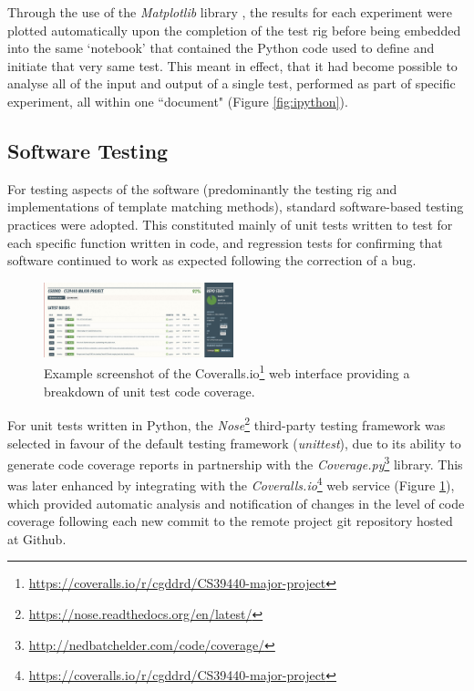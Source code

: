 Through the use of the \textit{Matplotlib} library \cite{matplotlib}, the results for each experiment were plotted automatically upon the completion of the test rig before being embedded into the same `notebook' that contained the Python code used to define and initiate that very same test. This meant in effect, that it had become possible to analyse all of the input and output of a single test, performed as part of specific experiment, all within one ``document" (Figure \ref{fig:ipython}).

\subsection{Software Testing}

For testing aspects of the software (predominantly the testing rig and implementations of template matching methods), standard software-based testing practices were adopted. This constituted mainly of unit tests written to test for each specific function written in code, and regression tests for confirming that software continued to work as expected following the correction of a bug.

\begin{figure}
\vspace{-20pt}
  \begin{center}
    \includegraphics[width=0.49\textwidth]{images/coveralls.png}
  \end{center}
  \vspace{-10pt}
  \caption{Example screenshot of the Coveralls.io\footnote{\url{https://coveralls.io/r/cgddrd/CS39440-major-project}} web interface providing a breakdown of unit test code coverage.}
     \label{fig:coveralls}
  \vspace{-10pt}
\end{figure}

For unit tests written in Python, the \textit{Nose}\footnote{\url{https://nose.readthedocs.org/en/latest/}} third-party testing framework was selected in favour of the default testing framework (\textit{unittest}), due to its ability to generate code coverage reports in partnership with the \textit{Coverage.py}\footnote{\url{http://nedbatchelder.com/code/coverage/}} library. This was later enhanced by integrating with the \textit{Coveralls.io}\footnote{\url{https://coveralls.io/r/cgddrd/CS39440-major-project}} web service (Figure \ref{fig:coveralls}), which provided automatic analysis and notification of changes in the level of code coverage following each new commit to the remote project git repository hosted at Github.

